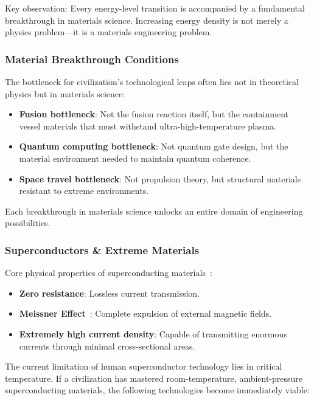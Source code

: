 \documentclass[aps,prd,twocolumn,superscriptaddress,nofootinbib]{revtex4-2}
\begin{document}
Key observation: Every energy-level transition is accompanied by a fundamental breakthrough in materials science. Increasing energy density is not merely a physics problem---it is a materials engineering problem.

\subsubsection{Material Breakthrough Conditions}\label{sec:material-breakthroughs}

The bottleneck for civilization's technological leaps often lies not in theoretical physics but in materials science:

\begin{itemize}
  \item \textbf{Fusion bottleneck}: Not the fusion reaction itself, but the containment vessel materials that must withstand ultra-high-temperature plasma.
  \item \textbf{Quantum computing bottleneck}: Not quantum gate design, but the material environment needed to maintain quantum coherence.
  \item \textbf{Space travel bottleneck}: Not propulsion theory, but structural materials resistant to extreme environments.
\end{itemize}

Each breakthrough in materials science unlocks an entire domain of engineering possibilities.

\subsubsection{Superconductors \& Extreme Materials}\label{sec:superconductors}

Core physical properties of superconducting materials~\cite{Meissner1933}:

\begin{itemize}
  \item \textbf{Zero resistance}: Lossless current transmission.
  \item \textbf{Meissner Effect}~\cite{Essen2012}: Complete expulsion of external magnetic fields.
  \item \textbf{Extremely high current density}: Capable of transmitting enormous currents through minimal cross-sectional areas.
\end{itemize}

The current limitation of human superconductor technology lies in critical temperature. If a civilization has mastered room-temperature, ambient-pressure superconducting materials, the following technologies become immediately viable:
\end{document}
